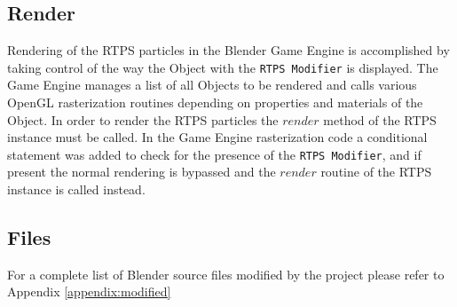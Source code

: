 \subsection{Render}
Rendering of the RTPS particles in the Blender Game Engine is accomplished by
taking control of the way the Object with the \verb|RTPS Modifier| is displayed. The
Game Engine manages a list of all Objects to be rendered and calls various
OpenGL rasterization routines depending on properties and materials of the
Object. In order to render the RTPS particles the $render$ method of the RTPS
instance must be called. In the Game Engine rasterization code a conditional
statement was added to check for the presence of the \verb|RTPS Modifier|, and if
present the normal rendering is bypassed and the $render$ routine of the RTPS
instance is called instead.

\subsection{Files}
For a complete list of Blender source files modified by the project please
refer to Appendix \ref{appendix:modified} 

